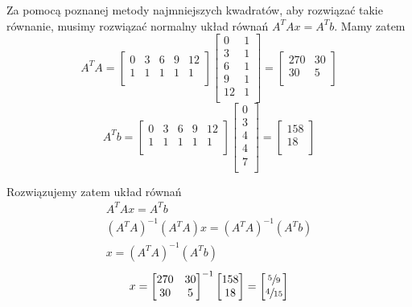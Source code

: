 \documentclass[a4paper,12pt]{article}
\begin{document}
Za pomocą poznanej metody najmniejszych kwadratów, aby rozwiązać takie równanie, musimy rozwiązać normalny układ równań \(A^T Ax = A^T b\). Mamy zatem
\[
	A^T A = 
	\begin{bmatrix}
		0 & 3 & 6 & 9 &  12 \\
		1 & 1 & 1 & 1 &  1 \\
	\end{bmatrix}
	\begin{bmatrix}
		0 &  1 \\
		3 &  1 \\
		6 &  1 \\
		9 &  1 \\
		12 &  1 \\
	\end{bmatrix}
	=
	\begin{bmatrix}
		270 &  30 \\
		30 &  5 \\
	\end{bmatrix}
\]
\[
	A^T b = 
	\begin{bmatrix}
		0 & 3 & 6 & 9 &  12 \\
		1 & 1 & 1 & 1 &  1 \\
	\end{bmatrix}
	\begin{bmatrix}
		 0 \\
		 3 \\
		 4 \\
		 4 \\
		 7 \\
	\end{bmatrix}
	=
	\begin{bmatrix}
		 158 \\
		 18 \\
	\end{bmatrix}
\]

Rozwiązujemy zatem układ równań
\begin{gather*}
	A^T Ax = A^T b \\
	(A^T A)^{-1} (A^T A)x = (A^T A)^{-1} (A^Tb) \\
	x = (A^T A)^{-1} (A^Tb)
\end{gather*}
\[
	x = 
	\begin{bmatrix}
		270 &  30 \\
		30 &  5 \\
	\end{bmatrix}^{-1} 
	\begin{bmatrix}
		158 \\
		18 \\
   \end{bmatrix}
   =
   \begin{bmatrix}
	 \sfrac{5}{9} \\
	 \sfrac{4}{15} \\
   \end{bmatrix}
\]
\end{document}
